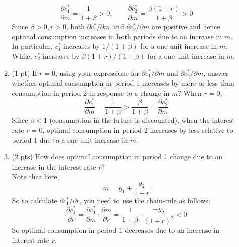 \documentclass{./../../Latex/tests}
\begin{document}
\begin{enumerate}
\begin{enumerate}
	$$\frac{\partial c_1^*}{\partial m} = \frac{1}{1+\beta}>0, \quad \quad \frac{\partial c_2^*}{\partial m} = \frac{\beta(1+r)}{1+\beta}>0 $$ 
	Since $\beta>0, r>0$, both $\partial c_1^*/\partial m$ and $\partial c_2^*/\partial m$ are positive and hence optimal consumption increases in both periods due to an increase in $m$. In particular, $c_1^*$ increases by $1/(1+\beta)$ for a one unit increase in $m$. While, $c_2^*$ increases by $\beta(1+r)/(1+\beta)$ for a one unit increase in $m$.
	\item (1 pt) If $r=0$, using your expressions for $\partial c_1^*/\partial m$ and $\partial c_2^*/\partial m$, answer whether optimal consumption in period 1 increases by more or less than consumption in period 2 in response to a change in $m$?
	When $r=0$, 
	$$\frac{\partial c_1^*}{\partial m} = \frac{1}{1+\beta}>\frac{\beta}{1+\beta}=\frac{\partial c_2^*}{\partial m} $$ 
	Since $\beta<1$ (consumption in the future is discounted), when the interest rate $r=0$, optimal consumption in period 2 increases by less relative to period 1 due to a one unit increase in $m$. 
	\item (2 pts) How does optimal consumption in period 1 change due to an increase in the interest rate $r$? \\
	
	Note that here, $$ m = y_1 + \frac{y_2}{1+r}  $$
	So to calculate $\partial c_1^*/\partial r$, you need to use the chain-rule as follows:
	$$ \frac{\partial c_1^*}{\partial r} = \frac{\partial c_1^*}{\partial m}\cdot \frac{\partial m}{\partial r} = \frac{1}{1+\beta}\cdot\frac{-y_2}{(1+r)^2} <0 $$
	So optimal consumption in period 1 decreases due to an increase in interest rate $r$. 
	\end{enumerate}

\end{enumerate}
\end{document}
